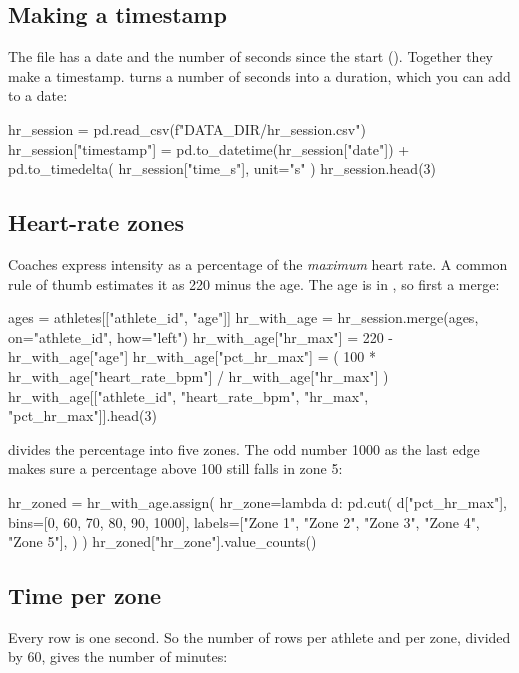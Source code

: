 \documentclass[11pt,a4paper]{article}
\begin{document}
\subsection{Making a timestamp}

The file has a date and the number of seconds since the start
(). Together they make a timestamp.
 turns a number of seconds into a
duration, which you can add to a date:

\begin{python}
hr_session = pd.read_csv(f"{DATA_DIR}/hr_session.csv")
hr_session["timestamp"] = pd.to_datetime(hr_session["date"]) + pd.to_timedelta(
    hr_session["time_s"], unit="s"
)
hr_session.head(3)
\end{python}

\subsection{Heart-rate zones}

Coaches express intensity as a percentage of the \emph{maximum} heart
rate. A common rule of thumb estimates it as 220 minus the age. The age
is in , so first a merge:

\begin{python}
ages = athletes[["athlete_id", "age"]]
hr_with_age = hr_session.merge(ages, on="athlete_id", how="left")
hr_with_age["hr_max"] = 220 - hr_with_age["age"]
hr_with_age["pct_hr_max"] = (
    100 * hr_with_age["heart_rate_bpm"] / hr_with_age["hr_max"]
)
hr_with_age[["athlete_id", "heart_rate_bpm", "hr_max", "pct_hr_max"]].head(3)
\end{python}

 divides the percentage into five zones. The odd number
1000 as the last edge makes sure a percentage above 100 still falls in
zone 5:

\begin{python}
hr_zoned = hr_with_age.assign(
    hr_zone=lambda d: pd.cut(
        d["pct_hr_max"],
        bins=[0, 60, 70, 80, 90, 1000],
        labels=["Zone 1", "Zone 2", "Zone 3", "Zone 4", "Zone 5"],
    )
)
hr_zoned["hr_zone"].value_counts()
\end{python}

\subsection{Time per zone}

Every row is one second. So the number of rows per athlete and per zone,
divided by 60, gives the number of minutes:
\end{document}
